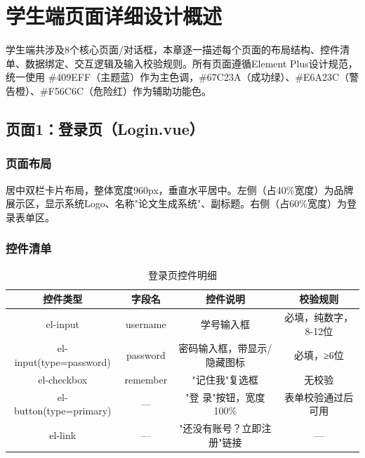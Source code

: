 
\section{学生端页面详细设计概述}

学生端共涉及8个核心页面/对话框，本章逐一描述每个页面的布局结构、控件清单、数据绑定、交互逻辑及输入校验规则。所有页面遵循Element Plus设计规范，统一使用 \#409EFF（主题蓝）作为主色调，\#67C23A（成功绿）、\#E6A23C（警告橙）、\#F56C6C（危险红）作为辅助功能色。

\subsection{页面1：登录页（Login.vue）}

\subsubsection{页面布局}
居中双栏卡片布局，整体宽度960px，垂直水平居中。左侧（占40\%宽度）为品牌展示区，显示系统Logo、名称"论文生成系统"、副标题。右侧（占60\%宽度）为登录表单区。

\subsubsection{控件清单}
\begin{table}[htbp]
    \centering
    \caption{登录页控件明细}
    \begin{tabular}{|c|c|c|c|}
        \hline
        \textbf{控件类型} & \textbf{字段名} & \textbf{控件说明} & \textbf{校验规则} \\
        \hline
        el-input & username & 学号输入框 & 必填，纯数字，8-12位 \\
        \hline
        el-input(type=password) & password & 密码输入框，带显示/隐藏图标 & 必填，≥6位 \\
        \hline
        el-checkbox & remember & "记住我"复选框 & 无校验 \\
        \hline
        el-button(type=primary) & — & "登 录"按钮，宽度100\% & 表单校验通过后可用 \\
        \hline
        el-link & — & "还没有账号？立即注册"链接 & — \\
        \hline
    \end{tabular}
\end{table}

